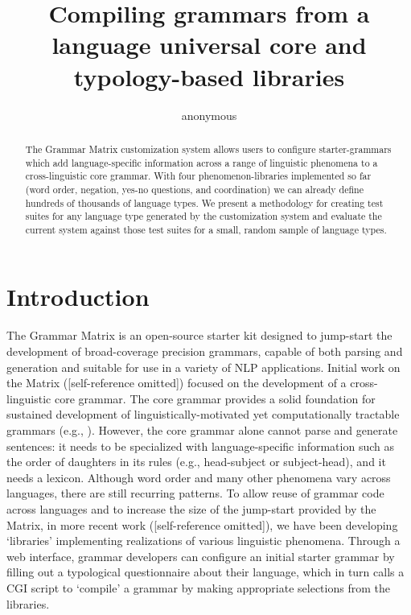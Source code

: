 \documentclass[11pt]{article}
\title{Compiling grammars from a language universal core and typology-based libraries}
\author{anonymous}
\date{}
\begin{document}
\maketitle
\begin{abstract}
The Grammar Matrix customization system allows users to configure
starter-grammars which add language-specific information across a
range of linguistic phenomena to a cross-linguistic core grammar.
With four phenomenon-libraries implemented so far (word order,
negation, yes-no questions, and coordination) we can already define
hundreds of thousands of language types.  We present a methodology for
creating test suites for any language type generated by the
customization system and evaluate the current system against those
test suites for a small, random sample of language types.
\end{abstract}

\section{Introduction}

The Grammar Matrix is an open-source starter kit designed to jump-start
the development of broad-coverage precision grammars, capable of both
parsing and generation and suitable for use in a variety of NLP applications.
Initial work on the Matrix ([self-reference omitted])
focused on the development of a cross-linguistic core grammar.  The
core grammar provides a solid foundation for sustained development of
linguistically-motivated yet computationally tractable grammars (e.g.,
\cite{Hel:Hau:03,Kor:Neu:05}).  However, the core grammar alone cannot
parse and generate sentences: it needs to be specialized with
language-specific information such as the order of daughters in its rules
(e.g., head-subject or subject-head), and it needs a lexicon.
Although word order and many other phenomena vary across languages,
there are still recurring patterns.  To allow reuse of grammar code
across languages and to increase the size of the jump-start provided
by the Matrix, in more recent work ([self-reference omitted]),
we have been developing `libraries' implementing realizations
of various linguistic phenomena.  Through a web interface, grammar
developers can configure an initial starter grammar by filling out
a typological questionnaire about their language, which in turn
calls a CGI script to `compile' a grammar by making appropriate selections
from the libraries.
\end{document}
